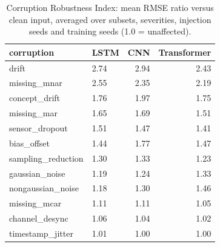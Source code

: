 \begin{table}
\caption{Corruption Robustness Index: mean RMSE ratio versus clean input, averaged over subsets, severities, injection seeds and training seeds (1.0 = unaffected).}
\label{tab:cri}
\begin{tabular}{llrr}
\toprule  %
corruption & LSTM & CNN & Transformer \\
\midrule
drift & 2.74 & 2.94 & 2.43 \\
missing\_mnar & 2.55 & 2.35 & 2.19 \\
concept\_drift & 1.76 & 1.97 & 1.75 \\
missing\_mar & 1.65 & 1.69 & 1.51 \\
sensor\_dropout & 1.51 & 1.47 & 1.41 \\
bias\_offset & 1.44 & 1.77 & 1.47 \\
sampling\_reduction & 1.30 & 1.33 & 1.23 \\
gaussian\_noise & 1.19 & 1.24 & 1.33 \\
nongaussian\_noise & 1.18 & 1.30 & 1.46 \\
missing\_mcar & 1.11 & 1.11 & 1.05 \\
channel\_desync & 1.06 & 1.04 & 1.02 \\
timestamp\_jitter & 1.01 & 1.00 & 1.00 \\
\bottomrule
\end{tabular}
\end{table}
